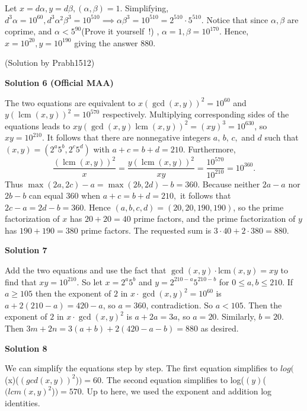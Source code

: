\begin{enumerate}
Let $x=d\alpha, y=d\beta, (\alpha, \beta)=1$. Simplifying, $d^3\alpha=10^{60}, d^3\alpha^2\beta^3=10^{510} \implies \alpha\beta^3 = 10^{510}=2^{510} \cdot 5^{510}$. Notice that since $\alpha, \beta$ are coprime, and $\alpha < 5^{90}$(Prove it yourself !) , $\alpha=1, \beta = 10^{170}$. Hence, $x=10^{20}, y=10^{190}$ giving the answer $\boxed{880}$. 

 (Solution by Prabh1512)

 



\textbf{Solution 6 (Official MAA)}

The two equations are equivalent to $x(\gcd(x,y))^2=10^{60}$ and $y(\operatorname{lcm}(x,y))^2=10^{570}$ respectively. Multiplying corresponding sides of the equations leads to $xy(\gcd(x,y)\operatorname{lcm}(x,y))^2=(xy)^3=10^{630}$, so $xy=10^{210}$. It follows that there are nonnegative integers $a,\,b,\,c,$ and $d$ such that $(x,y)=(2^a5^b,2^c5^d)$ with $a+c=b+d=210$. Furthermore, 
 \[\frac{(\operatorname{lcm}(x,y))^2}{x}=\frac{y(\operatorname{lcm}(x,y))^2}{xy}=\frac{10^{570}}{10^{210}}=10^{360}.\] Thus $\max(2a,2c)-a=\max(2b,2d)-b=360.$ Because neither $2a-a$ nor $2b-b$ can equal $360$ when $a+c=b+d=210,$ it follows that $2c-a=2d-b=360$. Hence $(a,b,c,d)=(20,20,190,190)$, so the prime factorization of $x$ has $20+20=40$ prime factors, and the prime factorization of $y$ has $190+190=380$ prime factors. The requested sum is $3\cdot40+2\cdot380=880.$




\textbf{Solution 7}

Add the two equations and use the fact that $\gcd\left(x,y\right)\cdot\mathrm{lcm}\left(x,y\right)=xy$ to find that $xy=10^{210}$. So let $x=2^a5^b$ and $y=2^{210-a}5^{210-b}$ for $0\leq a,b\leq210$. If $a\geq105$ then the exponent of $2$ in $x\cdot\gcd\left(x,y\right)^2=10^{60}$ is $a+2\left(210-a\right)=420-a$, so $a=360$, contradiction. So $a<105$. Then the exponent of $2$ in $x\cdot\gcd\left(x,y\right)^2$ is $a+2a=3a$, so $a=20$. Similarly, $b=20$. Then $3m+2n=3\left(a+b\right)+2\left(420-a-b\right)=\boxed{880}$ as desired.

 



\textbf{Solution 8}

We can simplify the equations step by step. The first equation simplifies to $log($(x)($(gcd(x,y))^2$)$)=60$. The second equation simplifies to log($(y)$($(lcm(x,y)^2$)$)=570$. Up to here, we used the exponent and addition log identities. 


\end{enumerate}
